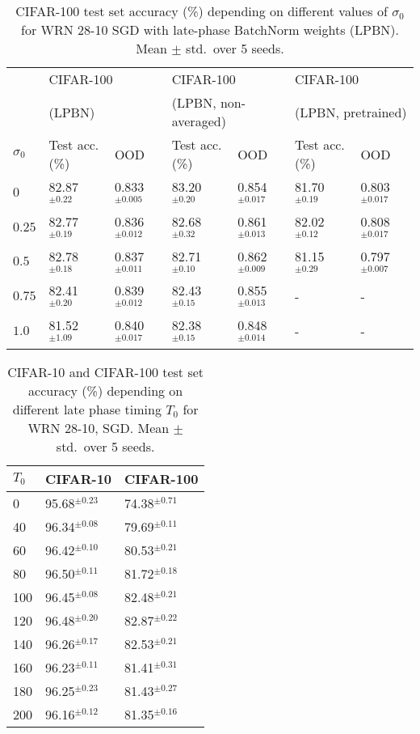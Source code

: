 \documentclass{article} \usepackage{iclr2021_conference,times}
\begin{document}
\begin{table}
\centering
\caption{CIFAR-100 test set accuracy (\%) depending on different values of $\sigma_{0}$ for WRN 28-10 SGD with late-phase BatchNorm weights (LPBN). Mean $\pm$ std.~over 5 seeds.\label{tab:sigma-sensitivity}}
\begin{tabular}{lllllll}
\toprule
& \multicolumn{2}{l}{CIFAR-100} &  \multicolumn{2}{l}{CIFAR-100} & \multicolumn{2}{l}{CIFAR-100} \\
& \multicolumn{2}{l}{(LPBN)}  &   \multicolumn{2}{l}{(LPBN, non-averaged)}  & \multicolumn{2}{l}{(LPBN, pretrained)} \\
\midrule
$\sigma_{0}$ & Test acc. (\%) & OOD&Test acc. (\%) & OOD&Test acc. (\%) & OOD \\\midrule
$0$ & 82.87$^{\pm 0.22}$& 0.833$^{\pm 0.005}$ &83.20$^{\pm 0.20}$&0.854$^{\pm 0.017}$ & 81.70$^{\pm 0.19}$    &0.803 $^{\pm 0.017}$  \\
$0.25$  & 82.77$^{\pm 0.19}$& 0.836$^{\pm 0.012}$ &82.68$^{\pm 0.32}$ & 0.861$^{\pm 0.013}$& 82.02$^{\pm 0.12}$  &0.808 $^{\pm 0.017}$ \\
$0.5$  & 82.78$^{\pm 0.18}$ & 0.837$^{\pm 0.011}$ & 82.71$^{\pm 0.10}$& 0.862$^{\pm 0.009}$& 81.15 $^{\pm 0.29}$&0.797 $^{\pm 0.007}$  \\
$0.75$  &  82.41$^{\pm 0.20}$& 0.839$^{\pm 0.012}$&82.43$^{\pm 0.15}$ & 0.855$^{\pm 0.013}$& - &- \\
$1.0$  &  81.52$^{\pm 1.09}$& 0.840$^{\pm 0.017}$ &82.38$^{\pm 0.15}$& 0.848$^{\pm 0.014}$&  - & - \\ \bottomrule  
\end{tabular}
\end{table}


\begin{wraptable}[18]{R}{0.45\textwidth}
\centering
\caption{CIFAR-10 and CIFAR-100 test set accuracy (\%) depending on different late phase timing $T_0$ for WRN 28-10, SGD. Mean $\pm$ std.~over 5 seeds.\label{tab:t0-sensitivity}}
\vspace{-0.2cm}
\begin{tabular}{lll}
\toprule
$T_{0}$    & CIFAR-10 & CIFAR-100   \\\midrule
0 &  95.68$^{\pm 0.23}$  &  74.38$^{\pm 0.71}$\\
40 &  96.34$^{\pm 0.08}$ &   79.69$^{\pm 0.11}$    \\
60 &  96.42$^{\pm 0.10}$ & 80.53$^{\pm 0.21}$\\
80 &  96.50$^{\pm 0.11}$ & 81.72$^{\pm 0.18}$ \\
100 &  96.45$^{\pm 0.08}$ & 82.48$^{\pm 0.21}$ \\
120 &  96.48$^{\pm 0.20}$ & 82.87$^{\pm 0.22}$ \\
140 &  96.26$^{\pm 0.17}$ & 82.53$^{\pm 0.21}$ \\
160 &  96.23$^{\pm 0.11}$ & 81.41$^{\pm 0.31}$ \\
180 &  96.25$^{\pm 0.23}$ & 81.43$^{\pm 0.27}$ \\
200 &  96.16$^{\pm 0.12}$ & 81.35$^{\pm 0.16}$ \\\bottomrule  
\end{tabular}
\end{wraptable}
\end{document}
